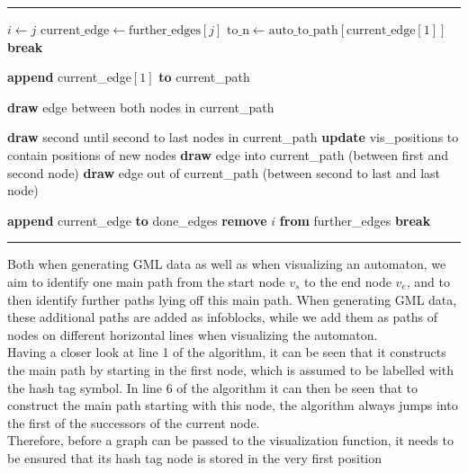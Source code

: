 \documentclass[a4paper,12pt,twoside,BCOR=10mm]{scrbook}
\makeatletter
\newenvironment{breakablealgorithm}
  {%
   \begin{center}
     \refstepcounter{algorithm}%
     \hrule height.8pt depth0pt \vspace{-0.45cm} \kern2pt%
     \renewcommand{\caption}[2][\relax]{%
       {\raggedright\textbf{\ALG@name~\thealgorithm} ##2\par}%
       \ifx\relax##1\relax %
         \addcontentsline{loa}{algorithm}{\protect\numberline{\thealgorithm}##2}%
       \else %
         \addcontentsline{loa}{algorithm}{\protect\numberline{\thealgorithm}##1}%
       \fi
       \kern2pt\hrule\kern2pt
     }
  }{%
     \kern2pt\hrule\relax%
   \end{center}
  }
\makeatother
\begin{document}
\begin{breakablealgorithm}
\begin{algorithmic}[1]
						\State $ i \gets j $
						\State $ \textrm{current\_edge} \gets \textrm{further\_edges}[ j ] $
						\State $ \textrm{to\_n} \gets \textrm{auto\_to\_path}[ \textrm{current\_edge}[ 1 ] ] $
						\State \textbf{break}
					\EndIf
				\EndFor
			\EndWhile

			\State \textbf{append} current\_edge$[ 1 ]$ \textbf{to} current\_path


				\State \textbf{draw} edge between both nodes in current\_path

			\Else

				\State \textbf{draw} second until second to last nodes in current\_path
				\State \textbf{update} vis\_positions to contain positions of new nodes
				\State \textbf{draw} edge into current\_path (between first and second node)
				\State \textbf{draw} edge out of current\_path (between second to last and last node)

			\EndIf

			\State \textbf{append} current\_edge \textbf{to} done\_edges
			\State \textbf{remove} $ i $ \textbf{from} further\_edges
			\State \textbf{break}
		\EndIf
	\EndFor

\EndWhile

\end{algorithmic}
\end{breakablealgorithm}
Both when generating GML data as well as when visualizing an automaton,
we aim to identify one main path from the start node $ v_s $ to the end node $ v_e $,
and to then identify further paths lying off this main path. When generating GML data,
these additional paths are added as infoblocks, while we add them as paths of nodes on
different horizontal lines when visualizing the automaton. \\
Having a closer look at line 1 of the algorithm,
it can be seen that it constructs the main path
by starting in the first node, which is assumed to
be labelled with the hash tag symbol.
In line 6 of the algorithm it can then be seen
that to construct the main path starting with this node,
the algorithm always jumps into the first of the successors of the current node. \\
Therefore, before a graph can be passed to the visualization function,
it needs to be ensured that its hash tag node is stored in the very first position
\end{document}
